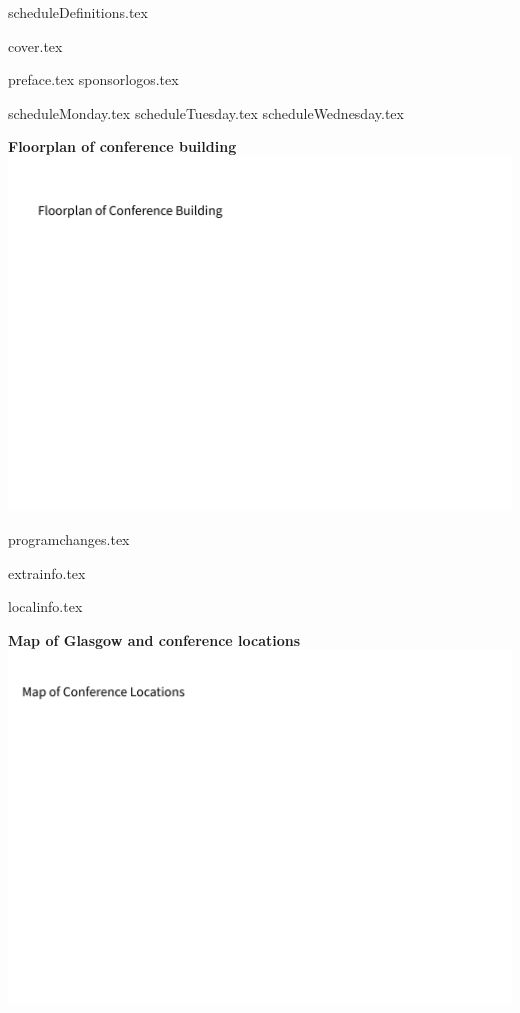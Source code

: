 \documentclass[8pt,british]{extreport}
\begin{document}
{scheduleDefinitions.tex}
\newcommand{\talk}[1]{\newline \small #1 \vspace{.08cm} \normalsize}
\newcommand{\pagelabel}{}
\newcommand{\onlyBook}[1]{}
\newcommand{\onlyProgram}[1]{#1}

{cover.tex}

{preface.tex}
\vfill
{sponsorlogos.tex}
\clearpage


\begin{centering}
\clearpage
{scheduleMonday.tex}
{scheduleTuesday.tex}
\clearpage
{scheduleWednesday.tex}
\clearpage
\end{centering}

\textbf{\Large Floorplan of conference building}\\[.2cm]
\includegraphics[width=\textwidth,trim={0 0 0 10cm},clip]{photopages/figures/floorplan_building.pdf}

{programchanges.tex}

{extrainfo.tex}

{localinfo.tex}
\clearpage

\textbf{\Large Map of Glasgow and conference locations}\\[.2cm]
\includegraphics[width=\textwidth,trim={0 0 0 3cm},clip]{photopages/figures/floorplan_city.pdf}
\end{document}
